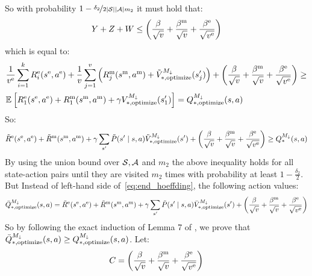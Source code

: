 %
So with probability $1 - \nicefrac{\delta_2}{2\left \lvert \mathcal{S} \right \rvert\left \lvert \mathcal{A} \right \rvert m_2}$  it must hold that:
    \begin{equation*}
        Y + Z +W \leq \left(\frac{\beta}{\sqrt v} + \frac{\beta^\text{m}}{\sqrt v} + \frac{\beta^\text{e}}{\sqrt{v^\text{e}}} \right)
    \end{equation*}
    which is equal to:
    \begin{align*}
        & \frac{1}{v^\text{e}} \sum_{i = 1}^{k}R^\text{e}_i(s^\text{e}, a^\text{e}) + \frac 1v\sum_{j = 1}^{v}\left(R^\text{m}_j(s^\text{m}, a^\text{m}) + \tilde{V}^{{M}_{\downarrow}}_{*, \text{optimize}}(s_{j}')\right) + \left(\frac{\beta}{\sqrt v} + \frac{\beta^\text{m}}{\sqrt v} + \frac{\beta^\text{e}}{\sqrt{v^\text{e}}} \right) \geq \\
        & \mathbb{E}_{}\left[ {R^\text{e}_1(s^\text{e}, a^\text{e}) + R^\text{m}_1(s^\text{m}, a^\text{m}) + \gamma V^{M_{\downarrow}}_{*, \text{optimize}}(s_1')} \right] = Q^{M_{\downarrow}}_{*, \text{optimize}}(s, a)
    \end{align*}
    So:
    \begin{equation}
        \label{eq:end_hoeffding}
        \tilde{R}^\text{e}(s^\text{e}, a^\text{e}) + \tilde{R}^\text{m}(s^\text{m}, a^\text{m}) + \gamma \sum_{s'}\tilde{P}(s' \mid s, a)\tilde{V}^{{M}_{\downarrow}}_{*, \text{optimize}}(s') + \left(\frac{\beta}{\sqrt v} + \frac{\beta^\text{m}}{\sqrt v} + \frac{\beta^\text{e}}{\sqrt{v^\text{e}}} \right) \geq Q^{M_{\downarrow}}_{*}(s, a)
    \end{equation}
    By using the union bound over $\mathcal{S}, \mathcal{A}$ and $m_2$ the above inequality holds for all state-action pairs until they are visited $m_2$ times with probability at least $1 - \frac{\delta_2}{2}$. But Instead of left-hand side of~\cref{eq:end_hoeffding}, \thealgo the following action values:
    \begin{equation}
        \bar{Q}^{M_{\downarrow}}_{*, \text{optimize}}(s, a) = \tilde{R}^\text{e}(s^\text{e}, a^\text{e}) + \tilde{R}^\text{m}(s^\text{m}, a^\text{m}) + \gamma \sum_{s'}\tilde{P}(s' \mid s, a)\bar{V}^{{M}_{\downarrow}}_{*, \text{optimize}}(s') + \left(\frac{\beta}{\sqrt v} + \frac{\beta^\text{m}}{\sqrt v} + \frac{\beta^\text{e}}{\sqrt{v^\text{e}}} \right)
    \end{equation}
    So by following the exact induction of Lemma 7 of \citet{strehl2008analysis}, we prove that $\bar{Q}_{*, \text{optimize}}^{M_{\downarrow}}(s, a) \geq Q^{M_{\downarrow}}_{*, \text{optimize}}(s, a)$. Let:
    \begin{equation*}
        C = \left(\frac{\beta}{\sqrt v} + \frac{\beta^\text{m}}{\sqrt v} + \frac{\beta^\text{e}}{\sqrt{v^\text{e}}} \right)
    \end{equation*} 
